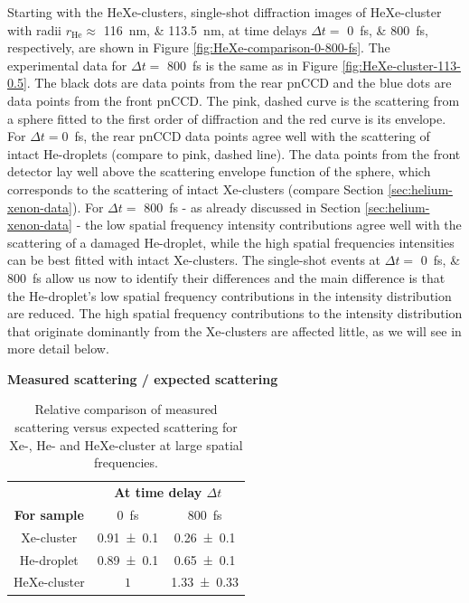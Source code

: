 %
Starting with the HeXe-clusters, single-shot diffraction images of HeXe-cluster with radii $r_{\text{He}}\approx$ \SIlist{116;113.5}{\nano\meter}, at time delays $\Delta t =$ \SIlist{0;800}{\femto\second}, respectively, are shown in Figure \ref{fig:HeXe-comparison-0-800-fs}. The experimental data for $\Delta t =$ \SI{800}{\femto\second} is the same as in Figure \ref{fig:HeXe-cluster-113-0.5}. The black dots are data points from the rear pnCCD and the blue dots are data points from the front pnCCD. The pink, dashed curve is the scattering from a sphere fitted to the first order of diffraction and the red curve is its envelope. 
For $\Delta t=$\SI{0}{\femto\second}, the rear pnCCD data points agree well with the scattering of intact He-droplets (compare to pink, dashed line). The data points from the front detector lay well above the scattering envelope function of the sphere, which corresponds to the scattering of intact Xe-clusters (compare Section \ref{sec:helium-xenon-data}). For $\Delta t =$ \SI{800}{\femto\second} - as already discussed in Section \ref{sec:helium-xenon-data} - the low spatial frequency intensity contributions agree well with the scattering of a damaged He-droplet, while the high spatial frequencies intensities can be best fitted with intact Xe-clusters. The single-shot events at $\Delta t=$ \SIlist{0;800}{\femto\second} allow us now to identify their differences and the main difference is that the He-droplet's low spatial frequency contributions in the intensity distribution are reduced. The high spatial frequency contributions to the intensity distribution that originate dominantly from the Xe-clusters are affected little, as we will see in more detail below.\\[1\baselineskip]
%
\begin{table}%
\centering
\textbf{Measured scattering / expected scattering}\\
\begin{tabular}{ | c || c | c | }
\hline
	 &\multicolumn{2}{c|}{\textbf{At time delay $\Delta t$}} \\
	\textbf{For sample} & \SI{0}{\femto\second}  & \SI{800}{\femto\second} \\ \hline \hline
	Xe-cluster & \num{0.91 \pm 0.1} & \num{0.26 \pm  0.1} \\ \hline
	He-droplet & \num{0.89 \pm 0.1} & \num{0.65\pm   0.1} \\ \hline
	HeXe-cluster & $1$ & \num{1.33 \pm  0.33} \\ \hline
\end{tabular}
\caption[Relative comparison of measured scattering versus expected scattering.]{Relative comparison of measured scattering versus expected scattering for Xe-, He- and HeXe-cluster at large spatial frequencies.}
\label{tab:he-vs-xe-vs-hexe-summary}
\end{table}
